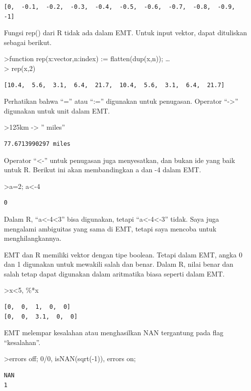 \documentclass[
]{book}
\begin{document}
\begin{verbatim}
[0,  -0.1,  -0.2,  -0.3,  -0.4,  -0.5,  -0.6,  -0.7,  -0.8,  -0.9,  -1]
\end{verbatim}

Fungsi rep() dari R tidak ada dalam EMT. Untuk input vektor, dapat dituliskan sebagai berikut.

\textgreater function rep(x:vector,n:index) := flatten(dup(x,n)); \ldots{}\\
\textgreater{} rep(x,2)

\begin{verbatim}
[10.4,  5.6,  3.1,  6.4,  21.7,  10.4,  5.6,  3.1,  6.4,  21.7]
\end{verbatim}

Perhatikan bahwa ``='' atau ``:='' digunakan untuk penugasan. Operator ``-\textgreater{}'' digunakan untuk unit dalam EMT.

\textgreater125km -\textgreater{} '' miles''

\begin{verbatim}
77.6713990297 miles
\end{verbatim}

Operator ``\textless-'' untuk penugasan juga menyesatkan, dan bukan ide yang baik untuk R. Berikut ini akan membandingkan a dan -4 dalam EMT.

\textgreater a=2; a\textless-4

\begin{verbatim}
0
\end{verbatim}

Dalam R, ``a\textless-4\textless3'' bisa digunakan, tetapi ``a\textless-4\textless-3'' tidak. Saya juga mengalami ambiguitas yang sama di EMT, tetapi saya mencoba untuk menghilangkannya.

EMT dan R memiliki vektor dengan tipe boolean. Tetapi dalam EMT, angka 0 dan 1 digunakan untuk mewakili salah dan benar. Dalam R, nilai benar dan salah tetap dapat digunakan dalam aritmatika biasa seperti dalam EMT.

\textgreater x\textless5, \%*x

\begin{verbatim}
[0,  0,  1,  0,  0]
[0,  0,  3.1,  0,  0]
\end{verbatim}

EMT melempar kesalahan atau menghasilkan NAN tergantung pada flag ``kesalahan''.

\textgreater errors off; 0/0, isNAN(sqrt(-1)), errors on;

\begin{verbatim}
NAN
1
\end{verbatim}
\end{document}
